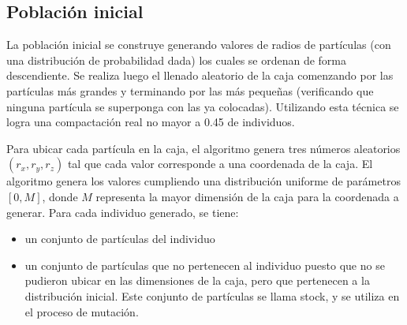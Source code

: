 \documentclass[a4paper,11pt]{book}
\begin{document}

\subsection{Población inicial}
La población inicial se construye generando valores de radios de partículas (con una distribución de probabilidad dada) los cuales se ordenan de forma descendiente. Se realiza luego el llenado aleatorio de la caja comenzando por las partículas más grandes y terminando por las más pequeñas (verificando que ninguna partícula se superponga con las ya colocadas). Utilizando esta técnica se logra una compactación real no mayor a 0.45 de individuos.


Para ubicar cada partícula en la caja, el algoritmo genera tres números aleatorios $(r_x,r_y,r_z)$ tal que cada valor corresponde a una coordenada de la caja. El algoritmo genera los valores cumpliendo una distribución uniforme de parámetros $[0, M]$, donde $M$ representa la mayor dimensión de la caja para la coordenada a generar.
Para cada individuo generado, se tiene:
\begin{itemize}
	\item un conjunto de partículas del individuo
	\item un conjunto de partículas que no pertenecen al individuo puesto que no se pudieron ubicar en las dimensiones de la caja, pero que pertenecen a la distribución inicial. Este conjunto de partículas se llama stock, y se utiliza en el proceso de mutación.
\end{itemize}

\end{document}
